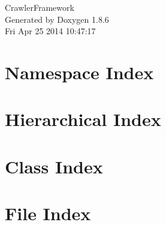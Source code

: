 \documentclass[twoside]{book}
\newcommand{\clearemptydoublepage}{%
  \newpage{\pagestyle{empty}\cleardoublepage}%
}
\begin{document}
\hypersetup{pageanchor=false}
\begin{titlepage}
\vspace*{7cm}
\begin{center}%
{\Large Crawler\-Framework }\\
\vspace*{1cm}
{\large Generated by Doxygen 1.8.6}\\
\vspace*{0.5cm}
{\small Fri Apr 25 2014 10:47:17}\\
\end{center}
\end{titlepage}
\clearemptydoublepage
\tableofcontents
\clearemptydoublepage
{}
\hypersetup{pageanchor=true}

\chapter{Namespace Index}

\chapter{Hierarchical Index}

\chapter{Class Index}

\chapter{File Index}

\end{document}
